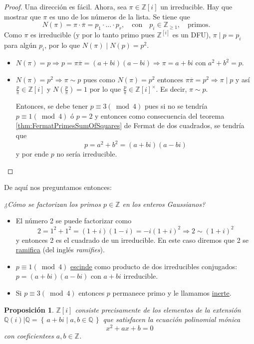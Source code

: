 \documentclass{amsbook}
\renewcommand{\.}{\cdot}
\renewcommand{\:}{\colon}               %
\newcommand{\x}{\times}
\newcommand{\bQ}{\mathbb{Q}}    %
\newcommand{\bZ}{\mathbb{Z}}    %
\newcommand{\set}[1]{\left\{\,#1\,\right\}}    %
\newcommand{\To}{\Rightarrow}
\newcommand{\word}[1]{\quad\mbox{#1}\quad} %
\newcommand{\ov}{\overline}        %
\newcommand{\un}{\underline}       %
\newcommand{\term}[1]{\un{#1}\index{#1}}
\theoremstyle{plain}
\newtheorem{Prop}[Th]{Proposición}     %
\theoremstyle{definition}
\theoremstyle{remark}
\numberwithin{equation}{section}
\begin{document}
\begin{proof}
    Una dirección es fácil. Ahora, sea $\pi\in\bZ[i]$ un irreducible. Hay que mostrar que $\pi$ es uno de los números de la lista. Se tiene que 
    $$N(\pi)=\pi\.\ov{\pi}=p_1\.\dots\.p_r,\word{con} p_i\in\bZ_{\geq 1},\word{primos.}$$
    Como $\pi$ es irreducible (y por lo tanto primo pues $\bZ^[i]$ es un DFU), $\pi\mid p=p_i$ para algún $p_i$, por lo que $N(\pi)\mid N(p)=p^2$. \begin{itemize}
        \item $N(\pi)=p\To p=\pi\ov{\pi}=(a+bi)(a-bi)\To \pi=a+bi$ con $a^2+b^2=p$.
        \item $N(\pi)=p^2\To \pi\sim p$ pues como $N(\pi)=p^2$ entonces $\pi\ov{\pi}=p^2\To \pi\mid p$ y así $\frac{p}{\pi}\in\bZ[i]$ y $N\left(\frac{p}{\pi}\right)=1$ por lo que $\frac{p}{\pi}\in\bZ[i]^\x$. Es decir, $\pi\sim p$.\par 
        Entonces, se debe tener $p\equiv 3(\bmod 4)$ pues si no se tendría $p\equiv 1(\bmod 4)$ ó $p=2$ y entonces como consecuencia del teorema \ref{thm:FermatPrimesSumOfSquares} de Fermat de dos cuadrados, se tendría que 
        $$p=a^2+b^2=(a+bi)(a-bi)$$
        y por ende $p$ no sería irreducible.
    \end{itemize}
\end{proof}
De aquí nos preguntamos entonces:
\begin{center}
    \emph{¿Cómo se factorizan los primos $p\in\bZ$ en los enteros Gaussianos?}
\end{center}
\begin{itemize}
    \item El número 2 se puede factorizar como
    $$2=1^2+1^2=(1+i)(1-i)=-i(1+i)^2\To 2\sim(1+i)^2$$
    y entonces 2 es el cuadrado de un irreducible. En este caso diremos que 2 se \term{ramifica} (del inglés \emph{ramifies}).
    \item $p\equiv 1(\bmod 4)$ \term{escinde} como producto de dos irreducibles conjugados: $p=(a+bi)(a-bi)$ con $a+bi$ irreducible.
    \item Si $p\equiv 3(\bmod 4)$ entonces $p$ permanece primo y le llamamos \term{inerte}.
\end{itemize}

\begin{Prop}
    $\bZ[i]$ consiste precisamente de los elementos de la extensión $\bQ(i)|\bQ=\set{a+bi\mid a,b\in\bQ}$ que satisfacen la ecuación polinomial mónica 
    $$x^2+ax+b=0$$
    con coeficientees $a,b\in\bZ$.
\end{Prop}
\end{document}
